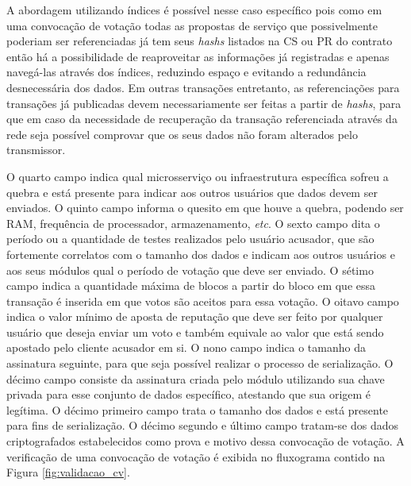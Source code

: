%
A abordagem utilizando índices é possível nesse caso específico pois como em uma convocação de votação todas as propostas de serviço que possivelmente poderiam ser referenciadas já tem seus \textit{hashs} listados na \ac{CS} ou \ac{PR} do contrato então há a possibilidade de reaproveitar as informações já registradas  e apenas navegá-las através dos índices, reduzindo espaço e evitando a redundância desnecessária dos dados. Em outras transações entretanto, as referenciações para transações já publicadas devem necessariamente ser feitas a partir de \textit{hashs}, para que em caso da necessidade de recuperação da transação referenciada através da rede seja possível comprovar que os seus dados não foram alterados pelo transmissor.

%
O quarto campo indica qual microsserviço ou infraestrutura específica sofreu a quebra e está presente para indicar aos outros usuários que dados devem ser enviados. O quinto campo informa o quesito em que houve a quebra, podendo ser RAM, frequência de processador, armazenamento, \textit{etc}. O sexto campo dita o período ou a quantidade de testes realizados pelo usuário acusador, que são fortemente correlatos com o tamanho dos dados e indicam aos outros usuários e aos seus módulos qual o período de votação que deve ser enviado. O sétimo campo indica a quantidade máxima de blocos a partir do bloco em que essa transação é inserida em que votos são aceitos para essa votação. O oitavo campo indica o valor mínimo de aposta de reputação que deve ser feito por qualquer usuário que deseja enviar um voto e também equivale ao valor que está sendo apostado pelo cliente acusador em si. O nono campo indica o tamanho da assinatura seguinte, para que seja possível realizar o processo de serialização. O décimo campo consiste da assinatura criada pelo módulo utilizando sua chave privada para esse conjunto de dados específico, atestando que sua origem é legítima. O décimo primeiro campo trata o tamanho dos dados e está presente para fins de serialização. O décimo segundo e último campo tratam-se dos dados criptografados estabelecidos como prova e motivo dessa convocação de votação. A verificação de uma convocação de votação é exibida no fluxograma contido na Figura \ref{fig:validacao_cv}.

